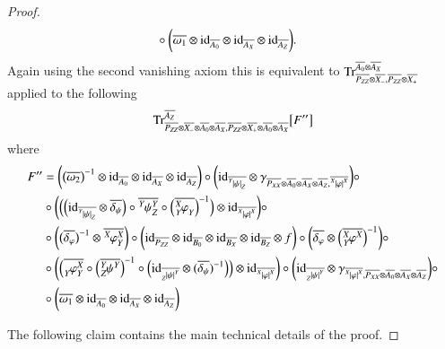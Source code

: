 \documentclass{amsart}
\def\tn{\textnormal}
\def\Trace{\tn{Tr}}
\def\ol{\overline}
\def\id{\tn{id}}
\newcommand{\inp}[1]{{#1_-}}
\newcommand{\outp}[1]{{#1_+}}
\newcommand{\feeddd}[3]{{\tensor*[^{#2}_{\color{white}{!}}]{{|#1|}}{^{#3}}}}%
\newcommand{\feeddc}[3]{{\tensor*[^{#2}]{{|#1|}}{_{#3}}}}
\newcommand{\feedcd}[3]{{\tensor*[_{#2}]{{|#1|}}{^{#3}}}}
\newcommand{\feedda}[3]{{\tensor*[^{#2}_{\color{white}{!}}]{{#1}}{^{#2}_{#3}}}}
\newcommand{\feedca}[3]{{\tensor*[_{#2}]{{#1}}{_{#2}^{#3}}}}
\newcommand{\feedad}[3]{{\tensor*[^{#2}_{#3}]{{#1}}{^{#2}}}}
\newcommand{\feedac}[3]{{\tensor*[_{#2}^{#3}]{{#1}}{_{#2}}}}
\theoremstyle{remark}
\theoremstyle{definition}
\begin{document}
\begin{proof}
\begin{align*}
&\circ\bigg(\ol{\omega_1}\otimes\id_{\ol{A_0}}\otimes\id_{\ol{A_X}}\otimes\id_{\ol{A_Z}}\bigg).
\end{align*}
Again using the second vanishing axiom this is equivalent to $\Trace^{\ol{A_0}\otimes\ol{A_X}}_{\ol{P_{ZZ}}\otimes\ol{\inp{X}},\ol{P_{ZZ}}\otimes\ol{\outp{X}}}$ applied to the following
\begin{align*}
\Trace^{\ol{A_Z}}_{\ol{P_{ZZ}}\otimes\ol{\inp{X}}\otimes\ol{A_0}\otimes\ol{A_X},\ol{P_{ZZ}}\otimes\ol{\outp{X}}\otimes\ol{A_0}\otimes\ol{A_X}}\big[F''\big]
\end{align*}
where
\begin{align*}
F''
&=\bigg(\big(\ol{\omega_2}\big)^{-1}\otimes\id_{\ol{A_0}}\otimes\id_{\ol{A_X}}\otimes\id_{\ol{A_Z}}\bigg)\circ\bigg(\id_{\ol{\feeddc{\psi}{Y}{Z}}}\otimes\gamma_{\ol{P_{XX}}\otimes\ol{A_0}\otimes\ol{A_X}\otimes\ol{A_Z},\ol{\feeddd{\varphi}{X}{X}}}\bigg)\circ\\
&\circ\bigg(\Big(\Big(\id_{\ol{\feeddc{\psi}{Y}{Z}}}\otimes\ol{\delta_\psi}\Big)\circ\ol{\feedda{\psi}{Y}{Z}}\circ\Big(\ol{\feedac{\varphi}{Y}{X}}\Big)^{-1}\Big)\otimes\id_{\ol{\feeddd{\varphi}{X}{X}}}\bigg)\circ\\
&\circ\bigg(\big(\ol{\delta_\varphi}\big)^{-1}\otimes\ol{\feedda{\varphi}{X}{Y}}\bigg)\circ\bigg(\id_{\ol{P_{ZZ}}}\otimes\id_{\ol{B_0}}\otimes\id_{\ol{B_X}}\otimes\id_{\ol{B_Z}}\otimes f\bigg)\circ\bigg(\ol{\delta_\varphi}\otimes\Big(\ol{\feedad{\varphi}{X}{Y}}\Big)^{-1}\bigg)\circ\\
&\circ\bigg(\Big(\ol{\feedca{\varphi}{Y}{X}}\circ\Big(\ol{\feedad{\psi}{Y}{Z}}\Big)^{-1}\circ\Big(\id_{\ol{\feedcd{\psi}{Z}{Y}}}\otimes(\ol{\delta_\psi})^{-1}\Big)\Big)\otimes\id_{\ol{\feeddd{\varphi}{X}{X}}}\bigg)\circ\bigg(\id_{\ol{\feedcd{\psi}{Z}{Y}}}\otimes\gamma_{\ol{\feeddd{\varphi}{X}{X}},\ol{P_{XX}}\otimes\ol{A_0}\otimes\ol{A_X}\otimes\ol{A_Z}}\bigg)\circ\\
&\circ\bigg(\ol{\omega_1}\otimes\id_{\ol{A_0}}\otimes\id_{\ol{A_X}}\otimes\id_{\ol{A_Z}}\bigg)\\
\end{align*}


The following claim contains the main technical details of the proof.


\end{proof}
\end{document}
